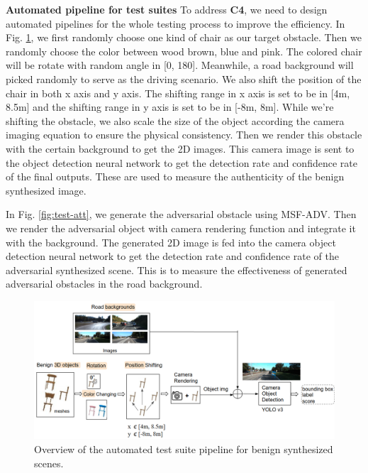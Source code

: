 \textbf{Automated pipeline for test suites} 
To address \textbf{C4}, we need to design automated pipelines for the whole testing process to improve the efficiency.
In Fig. \ref{fig:test-pipe}, we first randomly choose one kind of chair as our target obstacle.
Then we randomly choose the color between wood brown, blue and pink.
The colored chair will be rotate with random angle in [0\textdegree, 180\textdegree].
Meanwhile, a road background will picked randomly to serve as the driving scenario.
We also shift the position of the chair in both x axis and y axis.
The shifting range in x axis is set to be in [4m, 8.5m] and the shifting range in y axis is set to be in [-8m, 8m].
While we're shifting the obstacle, we also scale the size of the object according the camera imaging equation to ensure the physical consistency.
Then we render this obstacle with the certain background to get the 2D images.
This camera image is sent to the object detection neural network to get the detection rate and confidence rate of the final outputs.
These are used to measure the authenticity of the benign synthesized image.

In Fig. \ref{fig:test-att}, we generate the adversarial obstacle using MSF-ADV\cite{msf-adv}.
Then we render the adversarial object with camera rendering function and integrate it with the background. 
The generated 2D image is fed into the camera object detection neural network to get the detection rate and confidence rate of the adversarial synthesized scene.
This is to measure the effectiveness of generated adversarial obstacles in the road background.

\begin{figure}
	\centering
	\includegraphics[width=1\linewidth]{figure/test-pipeline.png}
	\caption{Overview of the automated test suite pipeline for benign synthesized scenes.}
	\label{fig:test-pipe}
\end{figure}

